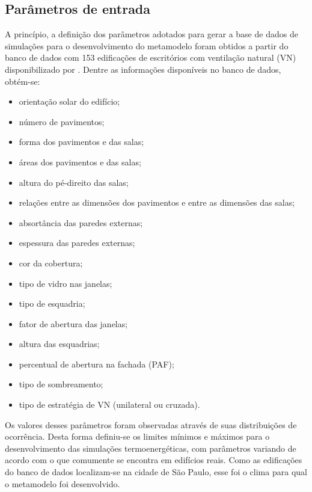 \documentclass[brazil,hardcopy,openany,a5paper]{ufscthesis}
\begin{document}
		\subsection{Parâmetros de entrada}\label{subsec:par}
		
		A princípio, a definição dos parâmetros adotados para gerar a base de dados de simulações para o desenvolvimento do metamodelo foram obtidos a partir do banco de dados com 153 edificações de escritórios com ventilação natural (VN) disponibilizado por  \cite{Pereira2018}.  		
		Dentre as informações  disponíveis no banco de dados, obtém-se:

		\begin{itemize}
			\item orientação solar do edifício;
			\item número de pavimentos;
			\item forma dos pavimentos e das salas;
			\item áreas dos pavimentos e das salas;
			\item altura do pé-direito das salas;
			\item relações entre as dimensões dos pavimentos e entre as dimensões das salas;
			\item absortância das paredes externas; %
			\item espessura das paredes externas;
			\item cor da cobertura;
			\item tipo de vidro nas janelas;
			\item tipo de esquadria;
			\item fator de abertura das janelas;
			\item altura das esquadrias;
			\item percentual de abertura na fachada (PAF);  %
			\item tipo de sombreamento;  %
			\item tipo de estratégia de VN (unilateral ou cruzada).
		\end{itemize} 
		
		Os valores desses parâmetros foram observadas através de suas distribuições de ocorrência. Desta forma definiu-se os limites mínimos e máximos para o desenvolvimento das simulações termoenergéticas, com parâmetros variando de acordo com o que comumente se encontra em edifícios reais. Como as edificações do banco de dados localizam-se na cidade de São Paulo, esse foi o clima para qual o metamodelo foi desenvolvido.
		
\end{document}
